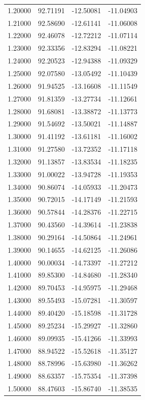 \begin{table}
\begin{tabular}{llll}
1.20000 & 92.71191 & -12.50081 & -11.04903 \\
1.21000 & 92.58690 & -12.61141 & -11.06008 \\
1.22000 & 92.46078 & -12.72212 & -11.07114 \\
1.23000 & 92.33356 & -12.83294 & -11.08221 \\
1.24000 & 92.20523 & -12.94388 & -11.09329 \\
1.25000 & 92.07580 & -13.05492 & -11.10439 \\
1.26000 & 91.94525 & -13.16608 & -11.11549 \\
1.27000 & 91.81359 & -13.27734 & -11.12661 \\
1.28000 & 91.68081 & -13.38872 & -11.13773 \\
1.29000 & 91.54692 & -13.50021 & -11.14887 \\
1.30000 & 91.41192 & -13.61181 & -11.16002 \\
1.31000 & 91.27580 & -13.72352 & -11.17118 \\
1.32000 & 91.13857 & -13.83534 & -11.18235 \\
1.33000 & 91.00022 & -13.94728 & -11.19353 \\
1.34000 & 90.86074 & -14.05933 & -11.20473 \\
1.35000 & 90.72015 & -14.17149 & -11.21593 \\
1.36000 & 90.57844 & -14.28376 & -11.22715 \\
1.37000 & 90.43560 & -14.39614 & -11.23838 \\
1.38000 & 90.29164 & -14.50864 & -11.24961 \\
1.39000 & 90.14655 & -14.62125 & -11.26086 \\
1.40000 & 90.00034 & -14.73397 & -11.27212 \\
1.41000 & 89.85300 & -14.84680 & -11.28340 \\
1.42000 & 89.70453 & -14.95975 & -11.29468 \\
1.43000 & 89.55493 & -15.07281 & -11.30597 \\
1.44000 & 89.40420 & -15.18598 & -11.31728 \\
1.45000 & 89.25234 & -15.29927 & -11.32860 \\
1.46000 & 89.09935 & -15.41266 & -11.33993 \\
1.47000 & 88.94522 & -15.52618 & -11.35127 \\
1.48000 & 88.78996 & -15.63980 & -11.36262 \\
1.49000 & 88.63357 & -15.75354 & -11.37398 \\
1.50000 & 88.47603 & -15.86740 & -11.38535 \\

\end{tabular}
\end{table}

